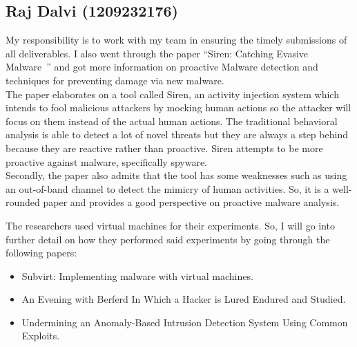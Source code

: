 \documentclass[16pt]{article}
\begin{document}
		\subsection{Raj Dalvi (1209232176)}
		My responsibility is to work with my team in ensuring the timely submissions of all deliverables. I also went through the paper “Siren: Catching Evasive Malware~\cite{borders2006siren}” and got more information on proactive Malware detection and techniques for preventing damage via new malware.\\
		The paper elaborates on a tool called Siren, an activity injection system which intends to fool malicious attackers by mocking human actions so the attacker will focus on them instead of the actual human actions. The traditional behavioral analysis is able to detect a lot of novel threats but they are always a step behind because they are reactive rather than proactive. Siren attempts to be more proactive against malware, specifically spyware.\\
		Secondly, the paper also admits that the tool has some weaknesses such as using an out-of-band channel to detect the mimicry of human activities. So, it is a well-rounded paper and provides a good perspective on proactive malware analysis.
		
		The researchers used virtual machines for their experiments. So, I will go into further detail on how they performed said experiments by going through the following papers:
		\begin{itemize}
			\item Subvirt: Implementing malware with virtual machines.~\cite{king2006subvirt}
			\item An Evening with Berferd In Which a Hacker is Lured Endured and Studied.~\cite{cheswick1992evening}
			\item Undermining an Anomaly-Based Intrusion Detection System Using Common Exploits.~\cite{tan2002undermining}
		\end{itemize}
		
	
\end{document}
